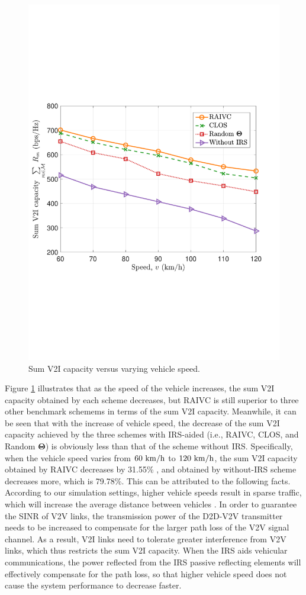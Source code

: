 \documentclass[journal]{IEEEtran}
\begin{document}
\begin{figure}[t]
	\centering
	\includegraphics[width=0.8\linewidth]{Fig5.pdf}%
	\caption{Sum V2I capacity versus varying vehicle speed.}
	\label{Fig5}
\end{figure}

Figure \ref{Fig5} illustrates that as the speed of the vehicle increases, the sum V2I capacity obtained by each scheme decreases, but RAIVC is still superior to three other benchmark schemems in terms of the sum V2I capacity. Meanwhile, it can be seen that with the increase of vehicle speed, the decrease of the sum V2I capacity achieved by the three schemes with IRS-aided (i.e., RAIVC, CLOS, and Random $ \bm{\Theta} $) is obviously less than that of the scheme without IRS. Specifically, when the vehicle speed varies from $60\ {\rm{km/h}}$ to $ 120\ {\rm{km/h}} $, the sum V2I capacity obtained by RAIVC decreases by 31.55\% , and obtained by without-IRS scheme decreases more, which is 79.78\%. This can be attributed to the following facts. According to our simulation settings, higher vehicle speeds result in sparse traffic, which will increase the average distance between vehicles \cite{3GPP}. In order to guarantee the SINR of V2V links, the transmission power of the D2D-V2V transmitter needs to be increased to compensate for the larger path loss of the V2V signal channel. As a result, V2I links need to tolerate greater interference from V2V links, which thus restricts the sum V2I capacity. When the IRS aids vehicular communications, the power reflected from the IRS passive reflecting elements will effectively compensate for the path loss, so that higher vehicle speed does not cause the system performance to decrease faster.
\end{document}

